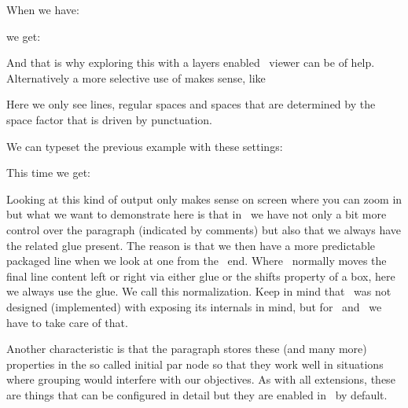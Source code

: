 When we have:

\startbuffer
\showmakeup {}
\stopbuffer

\typebuffer

we get:

\startlinecorrection
\scale[width=1tw]{\start \inlinebuffer \stop}
\stoplinecorrection

And that is why exploring this with a layers enabled \PDF\ viewer can be of help.
Alternatively a more selective use of \typ {\showmakup} makes sense, like

\startbuffer
{} 
\stopbuffer

\typebuffer

Here we only see lines, regular spaces and spaces that are determined by the
space factor that is driven by punctuation.

\startlinecorrection
\scale[width=1tw]{\start \inlinebuffer \stop}
\stoplinecorrection

\startbuffer[demo]
\leftskip         2cm
\rightskip        3cm
\hangindent       1cm
\parfillrightskip 1cm
\parfillleftskip  1cm %
\parinitrightskip 1cm %
\parinitleftskip  1cm %
\parindent        2cm %
\stopbuffer

\startbuffer
\showmakeup {}
\stopbuffer

We can typeset the previous example with these settings:

\typebuffer[demo]

This time we get:

\startlinecorrection
\scale[width=1tw]{\start \inlinebuffer \stop}
\stoplinecorrection

Looking at this kind of output only makes sense on screen where you can zoom in
but what we want to demonstrate here is that in \LUAMETATEX\ we have not only a
bit more control over the paragraph (indicated by comments) but also that we
always have the related glue present. The reason is that we then have a more
predictable packaged line when we look at one from the \LUA\ end. Where \TEX\
normally moves the final line content left or right via either glue or the shifts
property of a box, here we always use the glue. We call this normalization. Keep
in mind that \TEX\ was not designed (implemented) with exposing its internals in
mind, but for \LUATEX\ and \LUAMETATEX\ we have to take care of that.

Another characteristic is that the paragraph stores these (and many more)
properties in the so called initial par node so that they work well in situations
where grouping would interfere with our objectives. As with all extensions, these
are things that can be configured in detail but they are enabled in \CONTEXT\ by
default.

